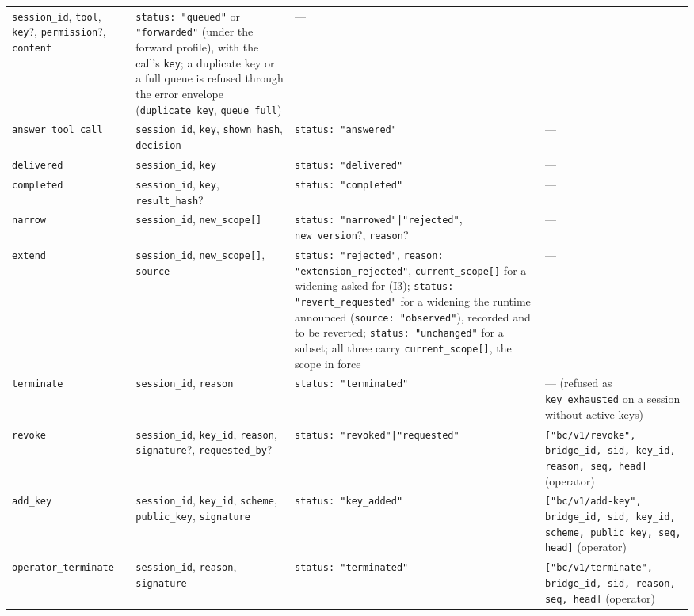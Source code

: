 \begin{longtable}{p{} p{} p{} p{}}
\texttt{session\_id}, \texttt{tool}, \texttt{key}?, \texttt{permission}?, \texttt{content} &
\texttt{status: "queued"} or \texttt{"forwarded"} (under the forward profile), with the call's \texttt{key}; a duplicate key or a full queue is refused through the error envelope (\texttt{duplicate\_key}, \texttt{queue\_full}) &
--- \\
\texttt{answer\_tool\_call} &
\texttt{session\_id}, \texttt{key}, \texttt{shown\_hash}, \texttt{decision} &
\texttt{status: "answered"} &
--- \\
\texttt{delivered} &
\texttt{session\_id}, \texttt{key} &
\texttt{status: "delivered"} &
--- \\
\texttt{completed} &
\texttt{session\_id}, \texttt{key}, \texttt{result\_hash}? &
\texttt{status: "completed"} &
--- \\
\texttt{narrow} &
\texttt{session\_id}, \texttt{new\_scope[]} &
\texttt{status: "narrowed"|"rejected"}, \texttt{new\_version}?, \texttt{reason}? &
--- \\
\texttt{extend} &
\texttt{session\_id}, \texttt{new\_scope[]}, \texttt{source} &
\texttt{status: "rejected"}, \texttt{reason: "extension\_rejected"},
\texttt{current\_scope[]} for a widening asked for (I3); \texttt{status:
"revert\_requested"} for a widening the runtime announced
(\texttt{source: "observed"}), recorded and to be reverted;
\texttt{status: "unchanged"} for a subset; all three carry
\texttt{current\_scope[]}, the scope in force &
--- \\
\texttt{terminate} &
\texttt{session\_id}, \texttt{reason} &
\texttt{status: "terminated"} &
--- (refused as \texttt{key\_exhausted} on a session without active keys) \\
\texttt{revoke} &
\texttt{session\_id}, \texttt{key\_id}, \texttt{reason}, \texttt{signature}?, \texttt{requested\_by}? &
\texttt{status: "revoked"|"requested"} &
\texttt{["bc/v1/revoke", bridge\_id, sid, key\_id, reason, seq, head]} (operator) \\
\texttt{add\_key} &
\texttt{session\_id}, \texttt{key\_id}, \texttt{scheme}, \texttt{public\_key}, \texttt{signature} &
\texttt{status: "key\_added"} &
\texttt{["bc/v1/add-key", bridge\_id, sid, key\_id, scheme, public\_key, seq, head]} (operator) \\
\texttt{operator\_terminate} &
\texttt{session\_id}, \texttt{reason}, \texttt{signature} &
\texttt{status: "terminated"} &
\texttt{["bc/v1/terminate", bridge\_id, sid, reason, seq, head]} (operator) \\
\bottomrule
\end{longtable}

